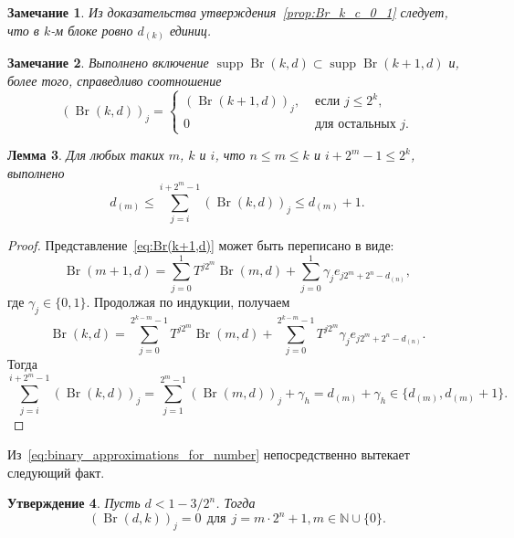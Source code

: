 \documentclass[a4paper,14pt]{article} %
\theoremstyle{plain}
\newtheorem{lemma}{Лемма}[section]
\newtheorem{remark}[lemma]{Замечание}
\newtheorem{proposition}[lemma]{Утверждение}
\begin{document}
\begin{remark}
	Из доказательства утверждения~\ref{prop:Br_k_c_0_1} следует, что в $k$-м блоке ровно $d_{(k)}$ единиц.
\end{remark}


\begin{remark}
	Выполнено включение $\operatorname{supp}\operatorname{Br}(k,d) \subset \operatorname{supp}\operatorname{Br}(k+1,d)$
	и, более того, справедливо соотношение
	\begin{equation}
		(\operatorname{Br}(k,d))_j = \begin{cases}
			(\operatorname{Br}(k+1,d))_j, & \mbox{~если~}  j \leq 2^k,
			\\
			0  & \mbox{~для остальных~} j
			.
		\end{cases}
	\end{equation}
\end{remark}

\begin{lemma}
	\label{lem:sum_Br_k_c}
	Для любых таких $m$, $k$ и $i$, что $n \leq m \leq k$ и  $ i + 2^m - 1 \leq 2^k$,
	выполнено
	\begin{equation}
		d_{(m)} \leq \sum_{j=i}^{i+2^m-1} (\operatorname{Br}(k,d))_j \leq d_{(m)}+1
		.
	\end{equation}
\end{lemma}
\begin{proof}
	Представление~\eqref{eq:Br(k+1,d)} может быть переписано в виде:
	\begin{equation}
		\operatorname{Br}(m+1,d) = \sum_{j=0}^{1} T^{j2^m} \operatorname{Br}(m,d) + \sum_{j=0}^{1} \gamma_{j} e_{j 2^m+2^n-d_{(n)}}
		,
	\end{equation}
	где $\gamma_{j} \in \{0,1\}$.
	Продолжая по индукции, получаем
	\begin{equation}
		\operatorname{Br}(k,d) = \sum_{j=0}^{2^{k-m}-1} T^{j2^m} \operatorname{Br}(m,d) +
		\sum_{j=0}^{2^{k-m}-1} T^{j2^m} \gamma_{j} e_{j2^m+2^n-d_{(n)}}
		.
	\end{equation}
	Тогда
	\begin{equation}
		\sum_{j=i}^{i+2^m-1} (\operatorname{Br}(k,d))_j
		=
		\sum_{j=1}^{2^m-1} (\operatorname{Br}(m,d))_j
		+ \gamma_h
		=
		d_{(m)} + \gamma_h
		\in \{d_{(m)}, d_{(m)}+1\}
		.
	\end{equation}
\end{proof}

Из~\eqref{eq:binary_approximations_for_number} непосредственно вытекает следующий факт.
\begin{proposition}
	\label{prop:Br_has_nulls}
	Пусть $d<1-3/2^n$.
	Тогда
	\begin{equation}
		(\operatorname{Br}(d,k))_j = 0 ~~\mbox{для}~~j = m\cdot 2^n + 1, m\in\mathbb{N} \cup\{0\}
		.
	\end{equation}
\end{proposition}
\end{document}
